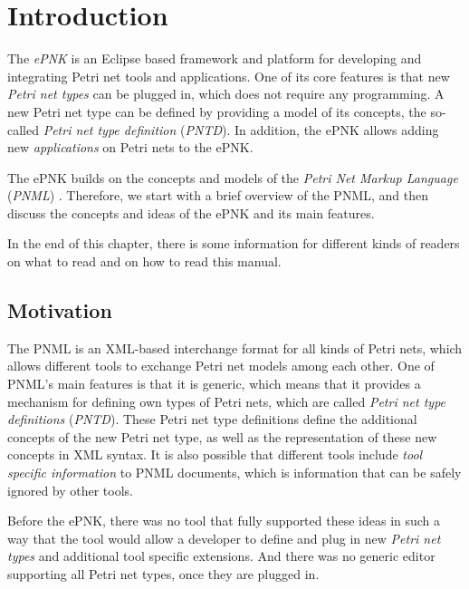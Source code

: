 
\chapter{Introduction}
\label{chap:intro}

The \emph{ePNK} is an Eclipse based framework and platform for developing
and integrating Petri net tools and applications. One of its core features
is that new \emph{Petri net types} can be plugged in, which does not require
any programming. A new Petri net type can be defined by providing a model
of its concepts, the so-called \emph{Petri net type definition} (\emph{PNTD}).
In addition, the ePNK allows adding new \emph{applications} on Petri nets
to the ePNK.

The ePNK builds on the concepts and models of the \emph{Petri Net Markup
Language} (\emph{PNML})
\cite{ISO-IEC:15909-2-2011,JKW00b,JKW00b,WeKi03,BCea03}.%
Therefore, we start with a brief overview of the PNML, and then discuss
the concepts and ideas of the ePNK and its main features.

In the end of this chapter, there is some information for
different kinds of readers on what to read and on how to read this manual.

\section{Motivation}
\label{chap:motivation}

The PNML is an XML-based interchange format for all kinds of Petri nets,
which allows different tools to exchange Petri net models among each other.
One of PNML's main features is that it is generic, which means that it provides
a mechanism for defining own types of Petri nets, which are called \emph{Petri
net type definitions} (\emph{PNTD}).%
These Petri net type definitions define the
additional concepts of the new Petri net type, as well as the representation of
these new concepts in XML syntax. It is also possible that different
tools include \emph{tool specific information}%
to PNML documents, which is information that can be safely ignored by
other tools.

Before the ePNK, there was no tool that fully supported these ideas in such a
way that the tool would allow a developer to define and plug in new
\emph{Petri net types}%
and additional tool specific extensions. And there was no
generic editor supporting all Petri net types, once they are plugged in.

